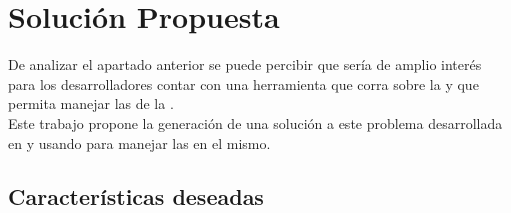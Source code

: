 \section{Solución Propuesta}
\label{sec:solution}

De analizar el apartado anterior se puede percibir que sería de amplio
interés para los desarrolladores contar con una herramienta que corra sobre
la \jvm y que permita manejar las \dependencies de la \viewtier.\\
Este trabajo propone la generación de una solución a este problema desarrollada
en \scala y usando \sbt para manejar las \dependencies en el mismo.\\



\subsection{Características deseadas}
\label{subsec:solution:characteristics}

